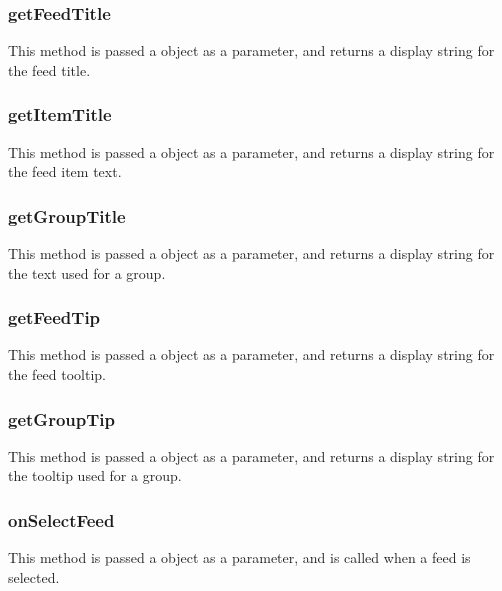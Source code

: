 \documentclass[letterpaper,12pt,english,openany,oneside]{sphinxmanual}
\begin{document}
\subsubsection{getFeedTitle}
\label{\detokenize{Tracker_InboxAPI:getfeedtitle}}
This method is passed a  object as a parameter, and returns a display string for the feed title.




\subsubsection{getItemTitle}
\label{\detokenize{Tracker_InboxAPI:getitemtitle}}
This method is passed a  object as a parameter, and returns a display string for the feed item text.




\subsubsection{getGroupTitle}
\label{\detokenize{Tracker_InboxAPI:getgrouptitle}}
This method is passed a  object as a parameter, and returns a display string for the text used for a group.




\subsubsection{getFeedTip}
\label{\detokenize{Tracker_InboxAPI:getfeedtip}}
This method is passed a  object as a parameter, and returns a display string for the feed tooltip.




\subsubsection{getGroupTip}
\label{\detokenize{Tracker_InboxAPI:getgrouptip}}
This method is passed a  object as a parameter, and returns a display string for the tooltip used for a group.




\subsubsection{onSelectFeed}
\label{\detokenize{Tracker_InboxAPI:onselectfeed}}
This method is passed a  object as a parameter, and is called when a feed is selected.
\end{document}
